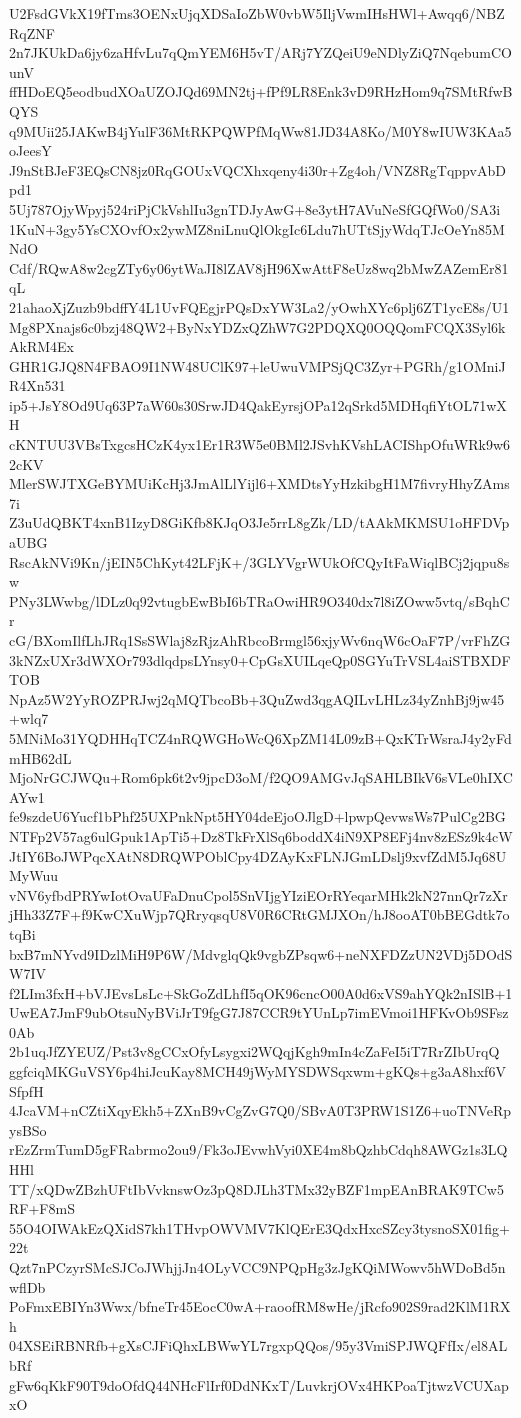 U2FsdGVkX19fTms3OENxUjqXDSaIoZbW0vbW5IljVwmIHsHWl+Awqq6/NBZRqZNF
2n7JKUkDa6jy6zaHfvLu7qQmYEM6H5vT/ARj7YZQeiU9eNDlyZiQ7NqebumCOunV
ffHDoEQ5eodbudXOaUZOJQd69MN2tj+fPf9LR8Enk3vD9RHzHom9q7SMtRfwBQYS
q9MUii25JAKwB4jYulF36MtRKPQWPfMqWw81JD34A8Ko/M0Y8wIUW3KAa5oJeesY
J9nStBJeF3EQsCN8jz0RqGOUxVQCXhxqeny4i30r+Zg4oh/VNZ8RgTqppvAbDpd1
5Uj787OjyWpyj524riPjCkVshlIu3gnTDJyAwG+8e3ytH7AVuNeSfGQfWo0/SA3i
1KuN+3gy5YsCXOvfOx2ywMZ8niLnuQlOkgIc6Ldu7hUTtSjyWdqTJcOeYn85MNdO
Cdf/RQwA8w2cgZTy6y06ytWaJI8lZAV8jH96XwAttF8eUz8wq2bMwZAZemEr81qL
21ahaoXjZuzb9bdffY4L1UvFQEgjrPQsDxYW3La2/yOwhXYc6plj6ZT1ycE8s/U1
Mg8PXnajs6c0bzj48QW2+ByNxYDZxQZhW7G2PDQXQ0OQQomFCQX3Syl6kAkRM4Ex
GHR1GJQ8N4FBAO9I1NW48UClK97+leUwuVMPSjQC3Zyr+PGRh/g1OMniJR4Xn531
ip5+JsY8Od9Uq63P7aW60s30SrwJD4QakEyrsjOPa12qSrkd5MDHqfiYtOL71wXH
cKNTUU3VBsTxgcsHCzK4yx1Er1R3W5e0BMl2JSvhKVshLACIShpOfuWRk9w62cKV
MlerSWJTXGeBYMUiKcHj3JmAlLlYijl6+XMDtsYyHzkibgH1M7fivryHhyZAms7i
Z3uUdQBKT4xnB1IzyD8GiKfb8KJqO3Je5rrL8gZk/LD/tAAkMKMSU1oHFDVpaUBG
RscAkNVi9Kn/jEIN5ChKyt42LFjK+/3GLYVgrWUkOfCQyItFaWiqlBCj2jqpu8sw
PNy3LWwbg/lDLz0q92vtugbEwBbI6bTRaOwiHR9O340dx7l8iZOww5vtq/sBqhCr
cG/BXomIlfLhJRq1SsSWlaj8zRjzAhRbcoBrmgl56xjyWv6nqW6cOaF7P/vrFhZG
3kNZxUXr3dWXOr793dlqdpsLYnsy0+CpGsXUILqeQp0SGYuTrVSL4aiSTBXDFTOB
NpAz5W2YyROZPRJwj2qMQTbcoBb+3QuZwd3qgAQILvLHLz34yZnhBj9jw45+wlq7
5MNiMo31YQDHHqTCZ4nRQWGHoWcQ6XpZM14L09zB+QxKTrWsraJ4y2yFdmHB62dL
MjoNrGCJWQu+Rom6pk6t2v9jpcD3oM/f2QO9AMGvJqSAHLBIkV6sVLe0hIXCAYw1
fe9szdeU6Yucf1bPhf25UXPnkNpt5HY04deEjoOJlgD+lpwpQevwsWs7PulCg2BG
NTFp2V57ag6ulGpuk1ApTi5+Dz8TkFrXlSq6boddX4iN9XP8EFj4nv8zESz9k4cW
JtIY6BoJWPqcXAtN8DRQWPOblCpy4DZAyKxFLNJGmLDslj9xvfZdM5Jq68UMyWuu
vNV6yfbdPRYwIotOvaUFaDnuCpol5SnVIjgYIziEOrRYeqarMHk2kN27nnQr7zXr
jHh33Z7F+f9KwCXuWjp7QRryqsqU8V0R6CRtGMJXOn/hJ8ooAT0bBEGdtk7otqBi
bxB7mNYvd9IDzlMiH9P6W/MdvglqQk9vgbZPsqw6+neNXFDZzUN2VDj5DOdSW7IV
f2LIm3fxH+bVJEvsLsLc+SkGoZdLhfI5qOK96cncO00A0d6xVS9ahYQk2nISlB+1
UwEA7JmF9ubOtsuNyBViJrT9fgG7J87CCR9tYUnLp7imEVmoi1HFKvOb9SFsz0Ab
2b1uqJfZYEUZ/Pst3v8gCCxOfyLsygxi2WQqjKgh9mIn4cZaFeI5iT7RrZIbUrqQ
ggfciqMKGuVSY6p4hiJcuKay8MCH49jWyMYSDWSqxwm+gKQs+g3aA8hxf6VSfpfH
4JcaVM+nCZtiXqyEkh5+ZXnB9vCgZvG7Q0/SBvA0T3PRW1S1Z6+uoTNVeRpysBSo
rEzZrmTumD5gFRabrmo2ou9/Fk3oJEvwhVyi0XE4m8bQzhbCdqh8AWGz1s3LQHHl
TT/xQDwZBzhUFtIbVvknswOz3pQ8DJLh3TMx32yBZF1mpEAnBRAK9TCw5RF+F8mS
55O4OIWAkEzQXidS7kh1THvpOWVMV7KlQErE3QdxHxcSZcy3tysnoSX01fig+22t
Qzt7nPCzyrSMcSJCoJWhjjJn4OLyVCC9NPQpHg3zJgKQiMWowv5hWDoBd5nwflDb
PoFmxEBIYn3Wwx/bfneTr45EocC0wA+raoofRM8wHe/jRcfo902S9rad2KlM1RXh
04XSEiRBNRfb+gXsCJFiQhxLBWwYL7rgxpQQos/95y3VmiSPJWQFfIx/el8ALbRf
gFw6qKkF90T9doOfdQ44NHcFlIrf0DdNKxT/LuvkrjOVx4HKPoaTjtwzVCUXapxO
